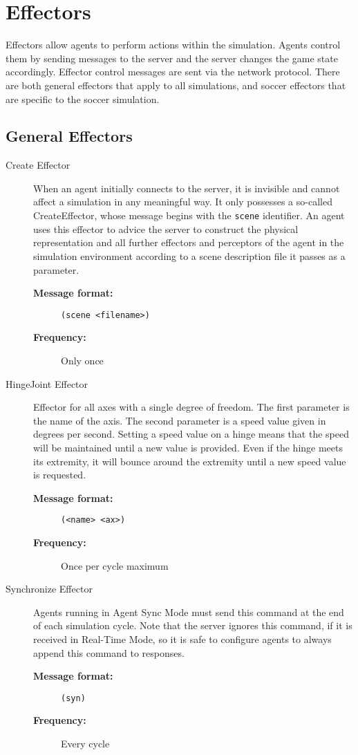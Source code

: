 \section{Effectors}

Effectors allow agents to perform actions within the simulation. Agents control them by sending messages to the server and the server changes the game state accordingly.
Effector control messages are sent via the network protocol. There are both general effectors that apply to all simulations, and soccer effectors that are specific to the soccer simulation.
\subsection{General Effectors}
\begin{description}


\item [Create Effector]
When an agent initially connects to the server, it is invisible and cannot affect a simulation in any meaningful way. It only possesses a so-called CreateEffector, whose message begins with the \texttt{scene} identifier. An agent uses this effector to advice the server to construct the physical representation and all further effectors and perceptors of the agent in the simulation environment according to a scene description file it passes as a parameter.
  \begin{description}
  \item[{\bf Message format:}]
  \texttt{(scene <filename>)}
  \item[{\bf Frequency:}]
  Only once
  \end{description}

  \item [HingeJoint Effector]
Effector for all axes with a single degree of freedom. The first parameter is the name of the axis. The second parameter is a speed value given in degrees per second. Setting a speed value on a hinge means that the speed will be maintained until a new value is provided. Even if the hinge meets its extremity, it will bounce around the extremity until a new speed value is requested.
  \begin{description}
  \item[{\bf Message format:}]
  \texttt{(<name> <ax>)}
  \item[{\bf Frequency:}]
  Once per cycle maximum
  \end{description}

  \item [Synchronize Effector]
  Agents running in Agent Sync Mode must send this command at the end of each simulation cycle. Note that the server ignores this command, if it is received in Real-Time Mode, so it is safe to configure agents to always append this command to responses.
  \begin{description}
  \item[{\bf Message format:}]
  \texttt{(syn)}
  \item[{\bf Frequency:}]
  Every cycle
  \end{description}

\end{description}




